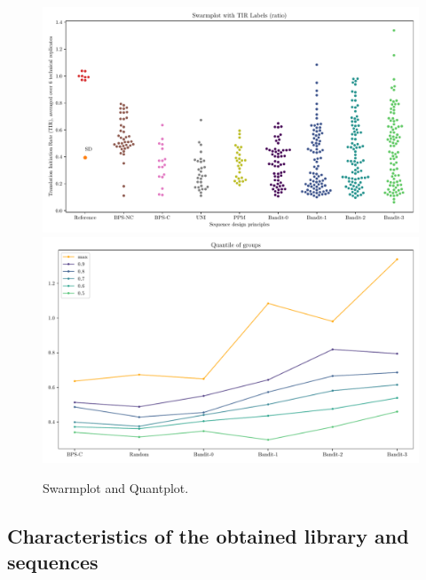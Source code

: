 \documentclass{article}
\begin{document}
\begin{figure}[h]
    \centering
    \includegraphics[scale=0.32]{paper/plots/swarmplot.pdf}
    \includegraphics[scale=0.32]{paper/plots/quantplot.pdf}
    \caption{Swarmplot and Quantplot.}
    \label{fig: Swarmplot and Quantplot}
\end{figure}

\subsection{Characteristics of the obtained library and sequences}
\end{document}
